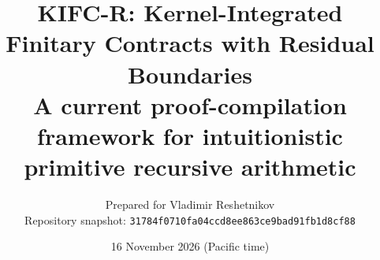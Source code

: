 \documentclass[11pt,oneside]{article}
\title{\textbf{KIFC-R: Kernel-Integrated Finitary Contracts with Residual Boundaries}\\[0.4em]
\large A current proof-compilation framework for intuitionistic primitive recursive arithmetic}
\author{Prepared for Vladimir Reshetnikov\\Repository snapshot: \texttt{31784f0710fa04ccd8ee863ce9bad91fb1d8cf88}}
\date{16 November 2026 (Pacific time)}
\begin{document}
\maketitle
\begin{abstract}

\end{abstract}
\tableofcontents
\newpage



















\appendix



\end{document}
